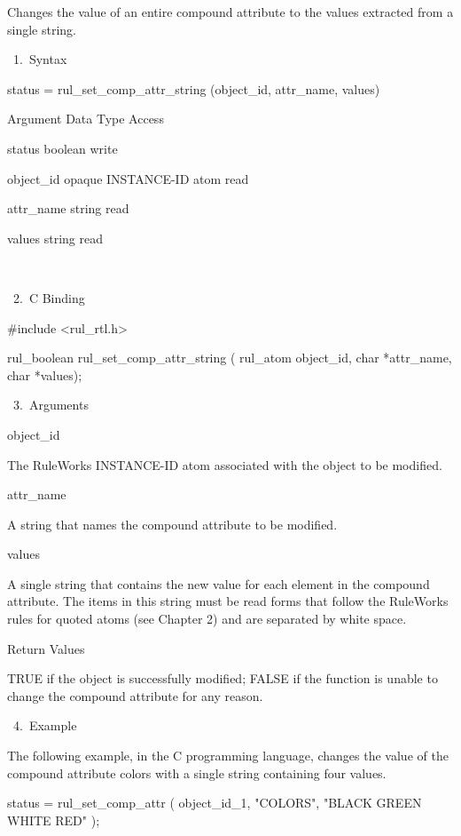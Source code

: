 {    Changes the value of an entire compound
    attribute to the values extracted from a
    single string.

       1. Syntax

          status = rul_set_comp_attr_string
          (object_id, attr_name, values)

          Argument  Data Type     Access

          status  boolean     write

          object_id  opaque INSTANCE-ID atom
           read

          attr_name  string     read

          values  string     read

           

       2. C Binding

          #include <rul_rtl.h>

          rul_boolean rul_set_comp_attr_string
          (
          rul_atom object_id,
          char *attr_name,
          char *values);

       3. Arguments

          object_id

          The RuleWorks INSTANCE-ID atom
          associated with the object to be
          modified.

          attr_name

          A string that names the compound
          attribute to be modified.

          values

          A single string that contains the
          new value for each element in the
          compound attribute. The items in
          this string must be read forms that
          follow the RuleWorks rules for
          quoted atoms (see Chapter 2) and are
          separated by white space.

          Return Values

          TRUE if the object is successfully
          modified; FALSE if the function is
          unable to change the compound
          attribute for any reason.

       4. Example

          The following example, in the C
          programming language, changes the
          value of the compound attribute
          colors with a single string
          containing four values.

          status = rul_set_comp_attr (
          object_id_1, "COLORS", "BLACK GREEN
          WHITE RED" );

}
